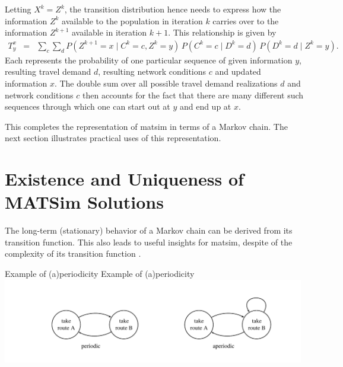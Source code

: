Letting $X^{k}=Z^{k}$, the transition distribution hence needs to express how
the information $Z^{k}$ available to the population in iteration $k$ carries
over to the information $Z^{k+1}$ available in iteration $k+1$. This
relationship is given by
\begin{eqnarray}
T_{y}^{x} & = & \sum_{c}\sum_{d}
%
P(Z^{k+1}\!=\!x\mid C^{k}\!=\!c,Z^{k}\!=\!y)
\, P(C^{k}\!=\!c\mid D^{k}\!=\!d) 
\, P(D^{k}\!=\!d\mid Z^{k}\!=\!y) .\label{eq:matsim-transition-distr}
\end{eqnarray}
Each  represents the
probability of one particular 
{sequence of given information $y$, resulting travel demand
$d$, resulting network conditions $c$ and updated information $x$}.
The double sum over all possible travel demand realizations $d$ and
network conditions $c$ then accounts for the fact that there are
many different such sequences through which one can start out at $y$
and end up at $x$.

This completes the representation of \gls{matsim} in terms of a Markov chain.
The next section illustrates practical uses of this representation.


\section{\label{sec:Existence-and-uniqueness}Existence and Uniqueness of
MATSim Solutions}

The long-term (stationary) behavior of a Markov chain can be derived
from its transition function. This also leads to useful insights for
 \gls{matsim}, despite of the complexity of its transition function
.

\createfigure%
{Example of (a)periodicity}%
{Example of (a)periodicity}%
{\label{fig:Example-of-(a)periodicity}}%
{\includegraphics[width=0.99\textwidth, angle=0]{understanding/figures/mc/fig1.pdf}}%
{}

